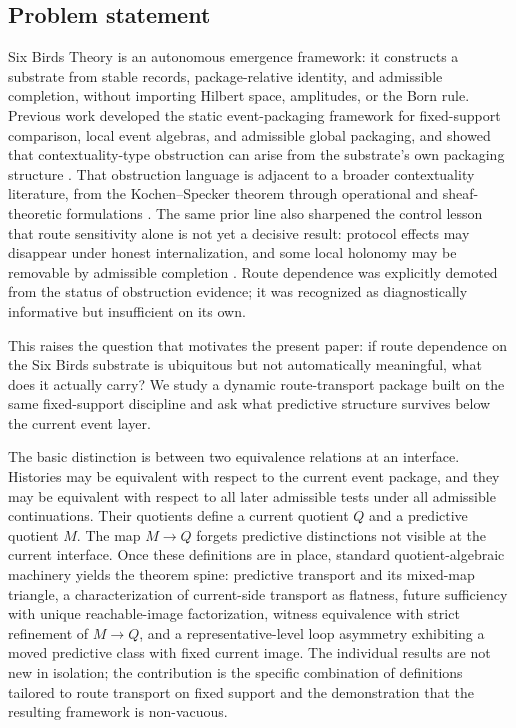 \documentclass[11pt]{article}
\newcommand{\CurrentQ}{Q}
\newcommand{\PredictiveQ}{M}
\theoremstyle{definition}
\begin{document}
\subsection{Problem statement}\label{subsec:intro-problem}
Six Birds Theory is an autonomous emergence framework: it constructs a substrate from stable records, package-relative identity, and admissible completion, without importing Hilbert space, amplitudes, or the Born rule. Previous work developed the static event-packaging framework for fixed-support comparison, local event algebras, and admissible global packaging, and showed that contextuality-type obstruction can arise from the substrate's own packaging structure \citep{Tsiokos2026EventPackages}. That obstruction language is adjacent to a broader contextuality literature, from the Kochen--Specker theorem through operational and sheaf-theoretic formulations \citep{KochenSpecker1968ProblemHiddenVariables,Spekkens2005Contextuality,AbramskyBrandenburger2011SheafTheoretic}. The same prior line also sharpened the control lesson that route sensitivity alone is not yet a decisive result: protocol effects may disappear under honest internalization, and some local holonomy may be removable by admissible completion \citep{Tsiokos2026ProtocolTrap,Tsiokos2026FlattenStone}. Route dependence was explicitly demoted from the status of obstruction evidence; it was recognized as diagnostically informative but insufficient on its own.

This raises the question that motivates the present paper: if route dependence on the Six Birds substrate is ubiquitous but not automatically meaningful, what does it actually carry? We study a dynamic route-transport package built on the same fixed-support discipline and ask what predictive structure survives below the current event layer.

The basic distinction is between two equivalence relations at an interface. Histories may be equivalent with respect to the current event package, and they may be equivalent with respect to all later admissible tests under all admissible continuations. Their quotients define a current quotient $\CurrentQ$ and a predictive quotient $\PredictiveQ$. The map $\PredictiveQ \to \CurrentQ$ forgets predictive distinctions not visible at the current interface. Once these definitions are in place, standard quotient-algebraic machinery yields the theorem spine: predictive transport and its mixed-map triangle, a characterization of current-side transport as flatness, future sufficiency with unique reachable-image factorization, witness equivalence with strict refinement of $\PredictiveQ \to \CurrentQ$, and a representative-level loop asymmetry exhibiting a moved predictive class with fixed current image. The individual results are not new in isolation; the contribution is the specific combination of definitions tailored to route transport on fixed support and the demonstration that the resulting framework is non-vacuous.
\end{document}
